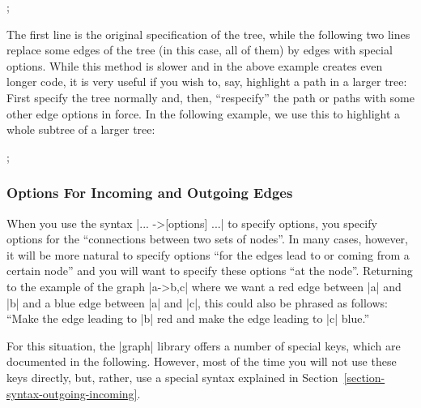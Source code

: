 \begin{codeexample}[]
\tikz {};  
\end{codeexample}

The first line is the original specification of the tree, while the
following two lines replace some edges of the tree (in this case, all
of them) by edges with special options. While this method is slower
and in the above example creates even longer code, it is very useful
if you wish to, say, highlight a path in a larger tree: First specify
the tree normally and, then, ``respecify'' the path or paths with some
other edge options in force. In the following example, we use this to
highlight a whole subtree of a larger tree:

\begin{codeexample}[]
\tikz {};  
\end{codeexample}



\subsubsection{Options For Incoming and Outgoing Edges}

When you use the syntax |... ->[options] ...| to specify options, you
specify options for the ``connections between two sets of nodes''. In
many cases, however, it will be more natural to specify options ``for
the edges lead to or coming from a certain node'' and you will want to
specify these options ``at the node''. Returning to the example of the
graph |a->{b,c}| where we want a red edge between |a| and |b| and a
blue edge between |a| and |c|, this could also be phrased as follows:
``Make the edge leading to |b| red and make the edge leading to |c|
blue.''

For this situation, the |graph| library offers a number of special
keys, which are documented in the following. However, most of the time
you will not use these keys directly, but, rather, use a special
syntax explained in Section~\ref{section-syntax-outgoing-incoming}.

